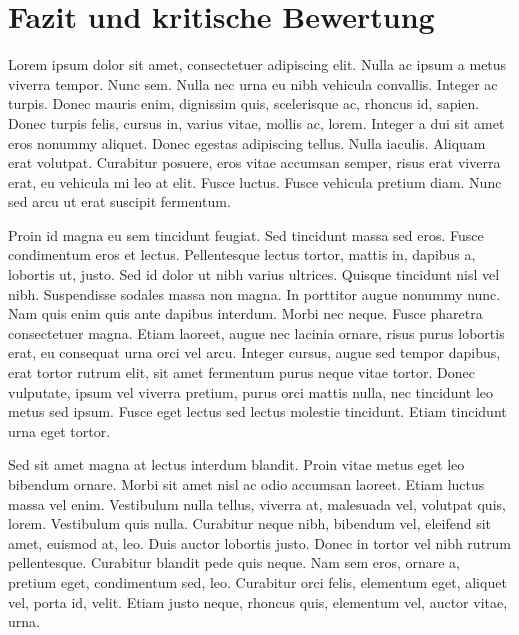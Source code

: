 \section{Fazit und kritische Bewertung}
\label{sec:Fazit}

Lorem ipsum dolor sit amet, consectetuer adipiscing elit. Nulla ac ipsum a metus viverra tempor. Nunc sem. Nulla nec urna eu nibh vehicula convallis. Integer ac turpis. Donec mauris enim, dignissim quis, scelerisque ac, rhoncus id, sapien. Donec turpis felis, cursus in, varius vitae, mollis ac, lorem. Integer a dui sit amet eros nonummy aliquet. Donec egestas adipiscing tellus. Nulla iaculis. Aliquam erat volutpat. Curabitur posuere, eros vitae accumsan semper, risus erat viverra erat, eu vehicula mi leo at elit. Fusce luctus. Fusce vehicula pretium diam. Nunc sed arcu ut erat suscipit fermentum.

Proin id magna eu sem tincidunt feugiat. Sed tincidunt massa sed eros. Fusce condimentum eros et lectus. Pellentesque lectus tortor, mattis in, dapibus a, lobortis ut, justo. Sed id dolor ut nibh varius ultrices. Quisque tincidunt nisl vel nibh. Suspendisse sodales massa non magna. In porttitor augue nonummy nunc. Nam quis enim quis ante dapibus interdum. Morbi nec neque. Fusce pharetra consectetuer magna. Etiam laoreet, augue nec lacinia ornare, risus purus lobortis erat, eu consequat urna orci vel arcu. Integer cursus, augue sed tempor dapibus, erat tortor rutrum elit, sit amet fermentum purus neque vitae tortor. Donec vulputate, ipsum vel viverra pretium, purus orci mattis nulla, nec tincidunt leo metus sed ipsum. Fusce eget lectus sed lectus molestie tincidunt. Etiam tincidunt urna eget tortor.

Sed sit amet magna at lectus interdum blandit. Proin vitae metus eget leo bibendum ornare. Morbi sit amet nisl ac odio accumsan laoreet. Etiam luctus massa vel enim. Vestibulum nulla tellus, viverra at, malesuada vel, volutpat quis, lorem. Vestibulum quis nulla. Curabitur neque nibh, bibendum vel, eleifend sit amet, euismod at, leo. Duis auctor lobortis justo. Donec in tortor vel nibh rutrum pellentesque. Curabitur blandit pede quis neque. Nam sem eros, ornare a, pretium eget, condimentum sed, leo. Curabitur orci felis, elementum eget, aliquet vel, porta id, velit. Etiam justo neque, rhoncus quis, elementum vel, auctor vitae, urna.
